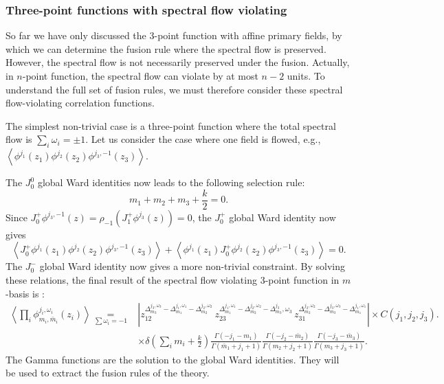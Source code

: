 \documentclass[10pt,a4paper]{article}
\numberwithin{equation}{section}
\newcommand{\vev}[1]{\left\langle #1 \right\rangle}
\begin{document}
\subsubsection*{Three-point functions with spectral flow violating}
So far we have only discussed the 3-point function with affine primary fields, by which we can determine the fusion rule where the 
spectral flow is preserved. However, the spectral flow is not necessarily preserved under the fusion. 
Actually, in $n$-point function, the spectral flow can violate by at most $n-2$ units. To understand the full set of fusion rules, 
we must therefore consider these spectral flow-violating correlation functions.

The simplest non-trivial case is a three-point function where the total spectral flow is $\sum_{i} \omega_{i} = \pm 1$. 
Let us consider the case where one field is flowed, e.g., $\vev{\phi^{j_{1}}(z_{1}) \phi^{j_{2}}(z_{2}) \phi^{j_{3},-1}(z_{3})}$. 

The $J^{0}_{0}$ global Ward identities now leads to the following selection rule: 
\begin{equation}
    m_{1} + m_{2} + m_{3} + \frac{k}{2} = 0.
\end{equation}
Since $J^{+}_{0} \phi^{j_{3},-1}(z) = \rho_{-1} \left( J^{+}_{1} \phi^{j_{3}}(z) \right) = 0$, the $J^{+}_{0}$ global Ward identity 
now gives 
\begin{equation}
    \vev{J^{+}_{0}\phi^{j_{1}}(z_{1}) \phi^{j_{2}}(z_{2}) \phi^{j_{3},-1}(z_{3})} + \vev{\phi^{j_{1}}(z_{1}) J^{+}_{0} \phi^{j_{2}}(z_{2}) \phi^{j_{3},-1}(z_{3})} = 0.
\end{equation}
The $J^{-}_{0}$ global Ward identity now gives a more non-trivial constraint. By solving these relations, the final result of 
the spectral flow violating 3-point function in $m$-basis is :
\begin{equation}
    \begin{aligned}
        \vev{\prod_{i} \phi^{j_{i},\omega_{i}}_{m_{i},\bar{m}_{i}}(z_{i})} \underset{\sum \omega_{i} = -1}{=} & 
        \left| z_{12}^{\Delta_{m_{3}}^{j_{3},\omega_{3}} -\Delta_{m_{1}}^{j_{1},\omega_{1}}-\Delta_{m_{2}}^{j_{2},\omega_{2}}} \, 
        z_{23}^{\Delta_{m_{1}}^{j_{1},\omega_{1}} -\Delta_{m_{2}}^{j_{2},\omega_{2}}-\Delta_{m_{3}}^{j_{3}} ,\omega_{3}} \, 
        z_{31}^{\Delta_{m_{2}}^{j_{2},\omega_{2}} -\Delta_{m_{3}}^{j_{3},\omega_{3}} -\Delta_{m_{1}}^{j_{1},\omega_{1}}}\right| 
        \times C(j_{1},j_{2},j_{3}).\\
        & \times \delta(\sum_{i} m_{i} + \frac{k}{2}) \frac{\Gamma(-j_{1}-m_{1})}{\Gamma(\bar{m}_{1}+j_{1}+1)} 
        \frac{\Gamma(-j_{2} - \bar{m}_{2} )}{\Gamma(m_{2} + j_{2} + 1)} \frac{\Gamma(-j_{3} - \bar{m}_{3} )}{\Gamma(m_{3} + j_{3} + 1)}.
    \end{aligned} \label{3pointfunc_m-1}
\end{equation}
The Gamma functions are the solution to the global Ward identities. They will be used to extract the fusion rules of the theory.
\end{document}
